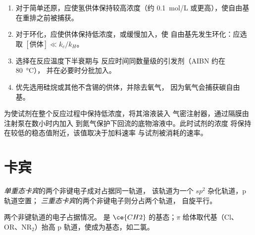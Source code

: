 \begin{method}[设计自由基还原或环化]\label{met:b3:radicals-carbenes:radical-chain}
\begin{enumerate}
  \item 对于简单还原，应使氢供体保持较高浓度（约
        \qty{0.1}{mol/L} 或更高），使自由基在重排之前被捕获。
  \item 对于环化，应使供体保持低浓度，或缓慢加入，使
        自由基先发生环化：应选取 $[\text{供体}] \ll k_c/k_H$。
  \item 选择在反应温度下半衰期与
        反应时间同数量级的引发剂（AIBN 约在 \qty{80}{\celsius}），
        并在必要时分批加入。
  \item 优先选用硅烷或其他不含锡的供体，并除去氧气，
        因为氧气会捕获碳自由基。
\end{enumerate}
\end{method}

\begin{inthelab}[用注射泵缓慢加料]
为使试剂在整个反应过程中保持低浓度，将其溶液装入
气密注射器，通过隔膜由注射泵在数小时内加入
到氮气保护下回流的底物溶液中。此时试剂的浓度
将保持在较低的稳态值附近，该值取决于加料速率
与试剂被消耗的速率。
\end{inthelab}

\section{卡宾}

\begin{definition}[单重态与三重态卡宾]\label{def:b3:radicals-carbenes:carbene-states}
\emph{单重态卡宾}的两个非键电子成对占据同一轨道，
该轨道为一个 $sp^2$ 杂化轨道，p 轨道空置；
\emph{三重态卡宾}的两个非键电子则分占两个轨道，
自旋平行。
\end{definition}

\begin{omfigure}

{\small {}两个非键轨道的电子占据情况。
是 $\ce{CH2}$ 的基态；$\pi$ 给体取代基（Cl、OR、$\mathrm{NR_2}$）抬高
p 轨道，使成为基态，如二氯。}
\end{omfigure}

